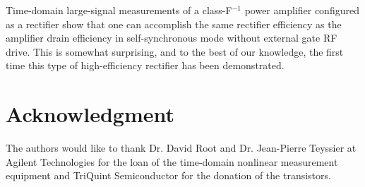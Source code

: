 Time-domain large-signal measurements of a class-F$^{-1}$ power amplifier configured as a rectifier show that one can accomplish the same rectifier efficiency as the amplifier drain efficiency in self-synchronous mode without external gate RF drive. This is somewhat surprising, and to the best of our knowledge, the first time this type of high-efficiency rectifier has been demonstrated.



\section*{Acknowledgment}


The authors would like to thank Dr. David Root and Dr. Jean-Pierre Teyssier at Agilent Technologies for the loan of the time-domain nonlinear measurement equipment and TriQuint Semiconductor for the donation of the transistors.




%


